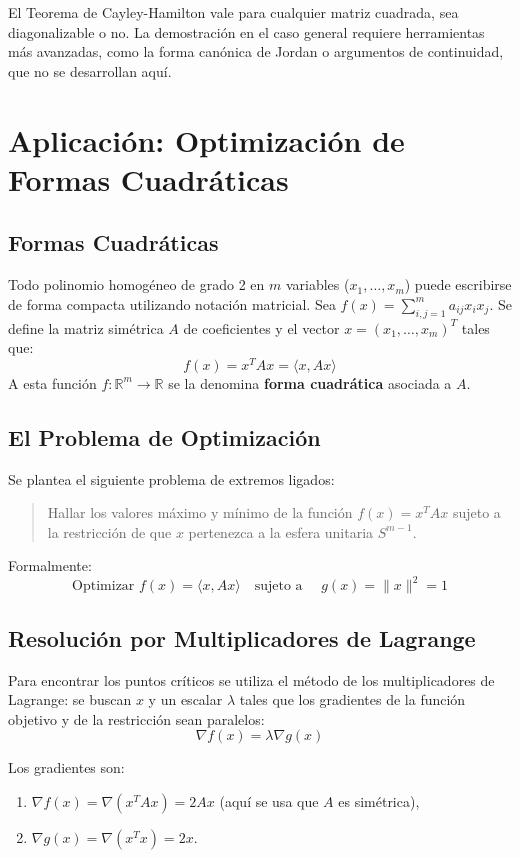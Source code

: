 \documentclass[11pt, a4paper]{article}
\begin{document}
\obs El Teorema de Cayley-Hamilton vale para cualquier matriz cuadrada, sea diagonalizable o no. La demostración en el caso general requiere herramientas más avanzadas, como la forma canónica de Jordan o argumentos de continuidad, que no se desarrollan aquí.

\newpage

\section{Aplicación: Optimización de Formas Cuadráticas}

\subsection{Formas Cuadráticas}

Todo polinomio homogéneo de grado 2 en $m$ variables ($x_1, \dots, x_m$) puede escribirse de forma compacta utilizando notación matricial.
Sea $f(x) = \sum_{i,j=1}^m a_{ij} x_i x_j$. Se define la matriz simétrica $A$ de coeficientes y el vector $x = (x_1, \dots, x_m)^T$ tales que:
\[ f(x) = x^T A x = \langle x, Ax \rangle \]
A esta función $f: \mathbb{R}^m \to \mathbb{R}$ se la denomina \textbf{forma cuadrática} asociada a $A$.

\subsection{El Problema de Optimización}

Se plantea el siguiente problema de extremos ligados:
\begin{quote}
    Hallar los valores máximo y mínimo de la función $f(x) = x^T A x$ sujeto a la restricción de que $x$ pertenezca a la esfera unitaria $S^{m-1}$.
\end{quote}
Formalmente:
\[ \text{Optimizar } f(x) = \langle x, Ax \rangle \quad \text{sujeto a } \quad g(x) = \|x\|^2 = 1 \]

\subsection{Resolución por Multiplicadores de Lagrange}

Para encontrar los puntos críticos se utiliza el método de los multiplicadores de Lagrange: se buscan $x$ y un escalar $\lambda$ tales que los gradientes de la función objetivo y de la restricción sean paralelos:
\[ \nabla f(x) = \lambda \nabla g(x) \]

Los gradientes son:
\begin{enumerate}
    \item $\nabla f(x) = \nabla (x^T A x) = 2Ax$ (aquí se usa que $A$ es simétrica),
    \item $\nabla g(x) = \nabla (x^T x) = 2x$.
\end{enumerate}
\end{document}

